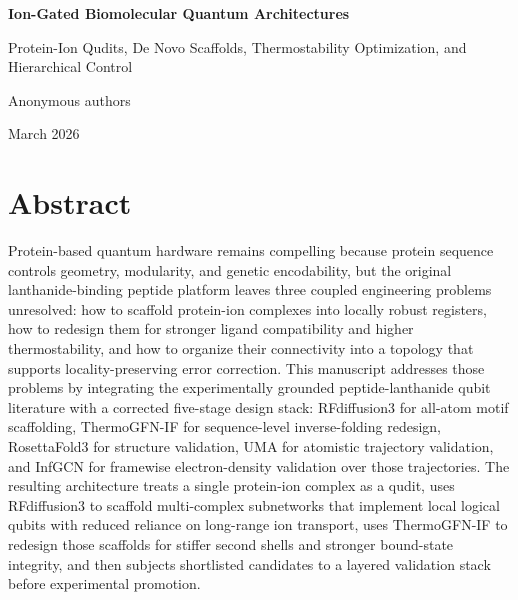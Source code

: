 \documentclass[11pt]{report}
\theoremstyle{definition}
\begin{document}
\begin{titlepage}
\centering
{\huge\bfseries Ion-Gated Biomolecular Quantum Architectures\par}
\vspace{0.5cm}
{\Large Protein-Ion Qudits, De Novo Scaffolds, Thermostability Optimization, and Hierarchical Control\par}
\vspace{1.2cm}
{\large Anonymous authors\par}
\vfill
{\large March 2026\par}
\end{titlepage}

\tableofcontents
\clearpage

\chapter*{Abstract}
Protein-based quantum hardware remains compelling because protein sequence controls geometry, modularity, and genetic encodability, but the original lanthanide-binding peptide platform leaves three coupled engineering problems unresolved: how to scaffold protein-ion complexes into locally robust registers, how to redesign them for stronger ligand compatibility and higher thermostability, and how to organize their connectivity into a topology that supports locality-preserving error correction. This manuscript addresses those problems by integrating the experimentally grounded peptide-lanthanide qubit literature with a corrected five-stage design stack: RFdiffusion3 for all-atom motif scaffolding, ThermoGFN-IF for sequence-level inverse-folding redesign, RosettaFold3 for structure validation, UMA for atomistic trajectory validation, and InfGCN for framewise electron-density validation over those trajectories. The resulting architecture treats a single protein-ion complex as a qudit, uses RFdiffusion3 to scaffold multi-complex subnetworks that implement local logical qubits with reduced reliance on long-range ion transport, uses ThermoGFN-IF to redesign those scaffolds for stiffer second shells and stronger bound-state integrity, and then subjects shortlisted candidates to a layered validation stack before experimental promotion.
\end{document}
